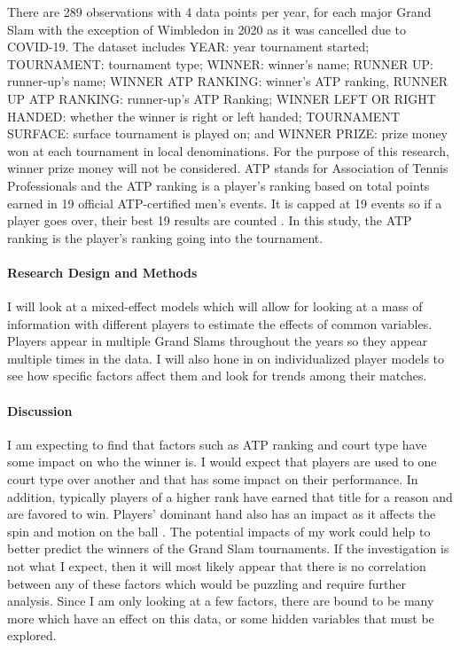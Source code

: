 \documentclass[12pt]{article}
\begin{document}
There are 289 observations with 4 data points per year, for each major 
Grand Slam with the exception of Wimbledon in 2020 as it was cancelled 
due to COVID-19. The dataset includes YEAR: year tournament started; 
TOURNAMENT: tournament type; WINNER: winner's name; RUNNER UP: runner-up's 
name; WINNER ATP RANKING: winner's ATP ranking, RUNNER UP ATP RANKING: 
runner-up's ATP Ranking; WINNER LEFT OR RIGHT HANDED: whether the winner 
is right or left handed; TOURNAMENT SURFACE: surface tournament is played 
on; and WINNER PRIZE: prize money won at each tournament in local 
denominations. For the purpose of this research, winner prize money will 
not be considered. ATP stands for Association of Tennis Professionals and 
the ATP ranking is a player's ranking based on total points earned in 19 
official ATP-certified men's events. It is capped at 19 events so if a 
player goes over, their best 19 results are counted \citet{Nag2022Tennis}. 
In this study, the ATP ranking is the player's ranking going into the 
tournament.

\paragraph{Research Design and Methods}

I will look at a mixed-effect models which will allow for looking at a 
mass of information with different players to estimate the effects of 
common variables. Players appear in multiple Grand Slams throughout the 
years so they appear multiple times in the data. I will also hone in on 
individualized player models to see how specific factors affect them and 
look for trends among their matches.

\paragraph{Discussion}
I am expecting to find that factors such as ATP ranking and court type 
have some impact on who the winner is. I would expect that players are 
used to one court type over another and that has some impact on their 
performance. In addition, typically players of a higher rank have earned 
that title for a reason and are favored to win. Players' dominant hand 
also has an impact as it affects the spin and motion on the ball \citet{Jurejko2018French}. 
The potential impacts of my work could help to better predict the winners 
of the Grand Slam tournaments. If the investigation is not what I expect, 
then it will most likely appear that there is no correlation between any 
of these factors which would be puzzling and require further analysis. 
Since I am only looking at a few factors, there are bound to be many more 
which have an effect on this data, or some hidden variables that must be 
explored.
\end{document}
